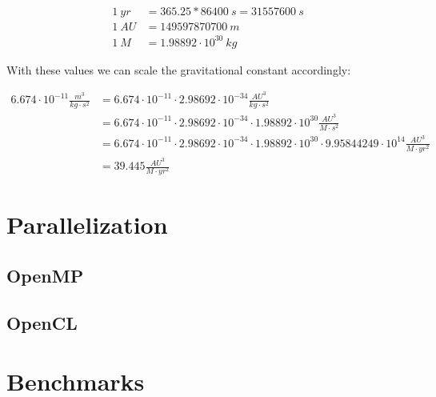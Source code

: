 \documentclass[a4paper,11pt]{scrartcl} %
\begin{document}
\begin{align*}
	1~yr &= 365.25 * 86400~s = 31557600~s \\
	1~AU &= 149597870700~m \\
	1~M &=  1.98892 \cdot 10^{30}~kg
\end{align*}

With these values we can scale the gravitational constant accordingly:

\begin{align*}
	6.674 \cdot 10^{-11} \frac{m^3}{kg \cdot s^2}
	& =  6.674 \cdot 10^{-11} \cdot 2.98692\cdot 10^{-34} \frac{AU^3}{kg \cdot s^2}\\
	& = 6.674 \cdot 10^{-11} \cdot 2.98692\cdot 10^{-34} \cdot 1.98892 \cdot 10^{30} \frac{AU^3}{M \cdot s^2} \\
	& = 6.674 \cdot 10^{-11} \cdot 2.98692\cdot 10^{-34} \cdot 1.98892 \cdot 10^{30} \cdot 9.95844249\cdot 10^{14} \frac{AU^3}{M \cdot yr^2}\\
	& = 39.445 \frac{AU^3}{M \cdot yr^2}
\end{align*}

\section{Parallelization}
\subsection{OpenMP}
\subsection{OpenCL}

\section{Benchmarks}



{}

\end{document}
